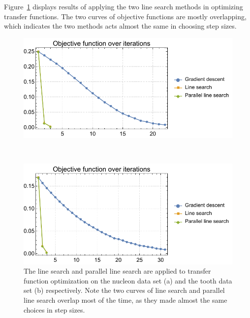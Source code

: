 Figure~\ref{fig:nucleon_naive_tooth_naive_rms_linesearch} displays results of applying the two line search methods in optimizing transfer functions. The two curves of objective functions are mostly overlapping, which indicates the two methods acts almost the same in choosing step sizes.

\begin{figure}
	\centering
	\begin{minipage}{.49\textwidth}
		\includegraphics[width=1\linewidth]{figures/nucleon_naive_proportional_rms_fixed_linesearch_parallel}
		\subcaption{}
	\end{minipage}~
	\begin{minipage}{.49\textwidth}
		\includegraphics[width=1\linewidth]{figures/tooth_naive_proportional_rms_fixed_linesearch_parallel}
		\subcaption{}
	\end{minipage}
	\caption[The line search and parallel line search]{The line search and parallel line search are applied to transfer function optimization on the nucleon data set (a) and the tooth data set (b) respectively. Note the two curves of line search and parallel line search overlap most of the time, as they made almost the same choices in step sizes.}
	\label{fig:nucleon_naive_tooth_naive_rms_linesearch}
\end{figure}

